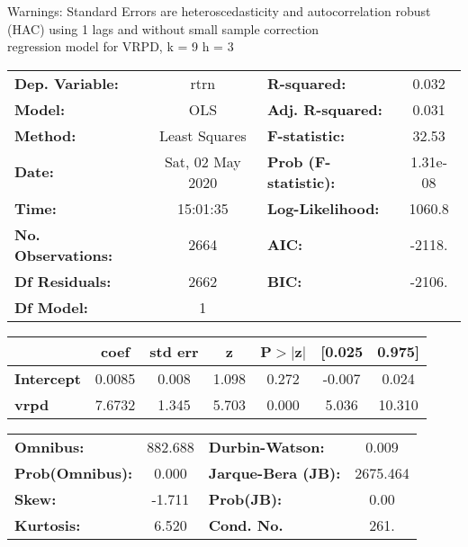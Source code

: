 Warnings: \newline
 [1] Standard Errors are heteroscedasticity and autocorrelation robust (HAC) using 1 lags and without small sample correction\\ 

regression model for VRPD, k = 9 h = 3\begin{center}
\begin{tabular}{lclc}
\toprule
\textbf{Dep. Variable:}    &       rtrn       & \textbf{  R-squared:         } &     0.032   \\
\textbf{Model:}            &       OLS        & \textbf{  Adj. R-squared:    } &     0.031   \\
\textbf{Method:}           &  Least Squares   & \textbf{  F-statistic:       } &     32.53   \\
\textbf{Date:}             & Sat, 02 May 2020 & \textbf{  Prob (F-statistic):} &  1.31e-08   \\
\textbf{Time:}             &     15:01:35     & \textbf{  Log-Likelihood:    } &    1060.8   \\
\textbf{No. Observations:} &        2664      & \textbf{  AIC:               } &    -2118.   \\
\textbf{Df Residuals:}     &        2662      & \textbf{  BIC:               } &    -2106.   \\
\textbf{Df Model:}         &           1      & \textbf{                     } &             \\
\bottomrule
\end{tabular}
\begin{tabular}{lcccccc}
                   & \textbf{coef} & \textbf{std err} & \textbf{z} & \textbf{P$> |$z$|$} & \textbf{[0.025} & \textbf{0.975]}  \\
\midrule
\textbf{Intercept} &       0.0085  &        0.008     &     1.098  &         0.272        &       -0.007    &        0.024     \\
\textbf{vrpd}      &       7.6732  &        1.345     &     5.703  &         0.000        &        5.036    &       10.310     \\
\bottomrule
\end{tabular}
\begin{tabular}{lclc}
\textbf{Omnibus:}       & 882.688 & \textbf{  Durbin-Watson:     } &    0.009  \\
\textbf{Prob(Omnibus):} &   0.000 & \textbf{  Jarque-Bera (JB):  } & 2675.464  \\
\textbf{Skew:}          &  -1.711 & \textbf{  Prob(JB):          } &     0.00  \\
\textbf{Kurtosis:}      &   6.520 & \textbf{  Cond. No.          } &     261.  \\
\bottomrule
\end{tabular}
\end{center}

